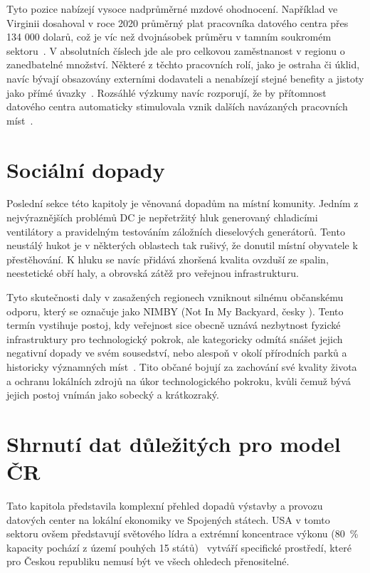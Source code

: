 Tyto pozice nabízejí vysoce nadprůměrné mzdové ohodnocení. Například ve Virginii dosahoval v roce 2020 průměrný plat pracovníka datového centra přes 134 000 dolarů, což je víc než dvojnásobek průměru v tamním soukromém sektoru~\cite[s.~83]{kshetri_data_2024}. V absolutních číslech jde ale pro celkovou zaměstnanost v regionu o zanedbatelné množství. Některé z těchto pracovních rolí, jako je ostraha či úklid, navíc bývají obsazovány externími dodavateli a nenabízejí stejné benefity a jistoty jako přímé úvazky~\cite[s.~7]{green_what_2025}. Rozsáhlé výzkumy navíc rozporují, že by přítomnost datového centra automaticky stimulovala vznik dalších navázaných pracovních míst~\cite{gargano_subsidizing_2025}.

\section{Sociální dopady}
\label{sec:socialni_dopady}

Poslední sekce této kapitoly je věnovaná dopadům na místní komunity. Jedním z nejvýraznějších problémů DC je nepřetržitý hluk generovaný chladicími ventilátory a pravidelným testováním záložních dieselových generátorů. Tento neustálý hukot je v některých oblastech tak rušivý, že donutil místní obyvatele k přestěhování. K hluku se navíc přidává zhoršená kvalita ovzduší ze spalin, neestetické obří haly, a obrovská zátěž pro veřejnou infrastrukturu.~\cite{kshetri_data_2024, ngata_cloud_2025}

Tyto skutečnosti daly v zasažených regionech vzniknout silnému občanskému odporu, který se označuje jako NIMBY (Not In My Backyard, česky ). Tento termín vystihuje postoj, kdy veřejnost sice obecně uznává nezbytnost fyzické infrastruktury pro technologický pokrok, ale kategoricky odmítá snášet jejich negativní dopady ve svém sousedství, nebo alespoň v okolí přírodních parků a historicky významných míst~\cite{kshetri_data_2024}. Tito občané bojují za zachování své kvality života a ochranu lokálních zdrojů na úkor technologického pokroku, kvůli čemuž bývá jejich postoj vnímán jako sobecký a krátkozraký.

\section{Shrnutí dat důležitých pro model ČR}

Tato kapitola představila komplexní přehled dopadů výstavby a provozu datových center na lokální ekonomiky ve Spojených státech. USA v tomto sektoru ovšem představují světového lídra a extrémní koncentrace výkonu (80~\% kapacity pochází z území pouhých 15 států)~\cite{de_roucy-rochegonde_ai_2025} vytváří specifické prostředí, které pro Českou republiku nemusí být ve všech ohledech přenositelné.

